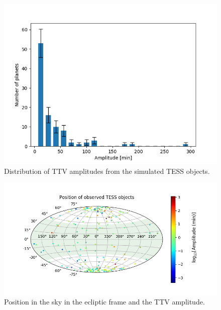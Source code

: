 \documentclass[12pt]{report}
\begin{document}
\begin{figure}[h!]
 	 \centering
	  \includegraphics[width=\textwidth]{img/ampl_tess_400.png}
	  \caption{Distribution of TTV amplitudes from the simulated TESS objects.}
	 \label{fig:ampl_histo}
\end{figure}
\begin{figure}[h!]
 	 \centering
	  \includegraphics[width=\textwidth]{img/skymap_TESS_amp.png}
	  \caption{Position in the sky in the ecliptic frame and the TTV amplitude.}
	 \label{fig:skymap_amp}
\end{figure}
\end{document}

